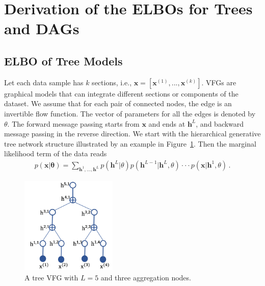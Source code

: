 \documentclass{article}
\begin{document}
\section{Derivation of the ELBOs for  Trees and DAGs }
\subsection{ELBO of Tree Models}\label{appd:tree_elbo}

Let each data sample has $k$ sections, i.e., $\mathbf{x} = [\mathbf{x}^{(1)}, ..., \mathbf{x}^{(k)}]$. VFGs are graphical models that can integrate different sections or components of the dataset.  We assume that for each pair of connected nodes, the edge is an invertible flow function. 
The vector of parameters for all the edges is denoted by $\theta$. 
The forward message passing starts from $\mathbf{x}$ and ends at $\mathbf{h}^L$, and backward message passing in the reverse direction. We start with the hierarchical generative tree network structure illustrated by an example in Figure~\ref{fig:tree_vfg}. 
Then the marginal likelihood term of the data reads
\begin{align*}
p(\mathbf{x}| \mathbf{\theta}) = \sum_{\mathbf{h}^1, ..., \mathbf{h}^L} p(\mathbf{h}^L | \theta)p(\mathbf{h}^{L-1} | \mathbf{h}^{L},\theta) \cdot \cdot  \cdot  p(\mathbf{x} | \mathbf{h}^{1}, \theta) \, .
\end{align*}

\begin{figure}[H]
    \centering
    \includegraphics[width=1.8in]{fig/tree_vfg.png}
    \caption{A  tree VFG with $L=5$ and three aggregation nodes.}
    \label{fig:tree_vfg}
\end{figure}
\end{document}
